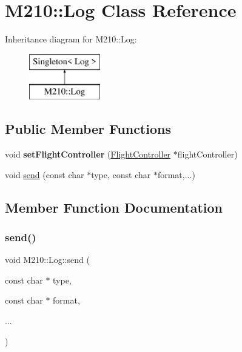\hypertarget{class_m210_1_1_log}{}\section{M210\+:\+:Log Class Reference}
\label{class_m210_1_1_log}
Inheritance diagram for M210\+:\+:Log\+:\begin{figure}[H]
\begin{center}
\leavevmode
\includegraphics[height=2.000000cm]{class_m210_1_1_log}
\end{center}
\end{figure}
\subsection*{Public Member Functions}
\begin{DoxyCompactItemize}
\item 
\mbox{\label{class_m210_1_1_log_a443fed7516e6cf2928a70e42587aa28a}} 
void {\bfseries set\+Flight\+Controller} (\mbox{\hyperlink{class_m210_1_1_flight_controller}{Flight\+Controller}} $\ast$flight\+Controller)
\item 
void \mbox{\hyperlink{class_m210_1_1_log_a83662b0f91b3504917713d0b489b2e7d}{send}} (const char $\ast$type, const char $\ast$format,...)
\end{DoxyCompactItemize}


\subsection{Member Function Documentation}
\mbox{\label{class_m210_1_1_log_a83662b0f91b3504917713d0b489b2e7d}} 
\subsubsection{\texorpdfstring{send()}{send()}}
{\footnotesize\ttfamily void M210\+::\+Log\+::send (\begin{DoxyParamCaption}\item[{const char $\ast$}]{type,  }\item[{const char $\ast$}]{format,  }\item[{}]{... }\end{DoxyParamCaption})}

